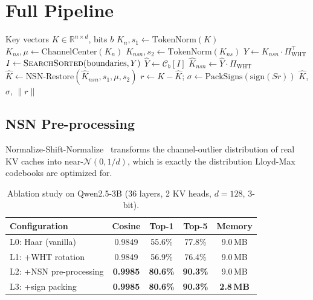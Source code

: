 \documentclass[letterpaper,11pt]{article}
\newcommand{\R}{\mathbb{R}}
\newcommand{\norm}[1]{\lVert #1 \rVert}
\begin{document}
\section{Full Pipeline}
\label{sec:pipeline}

\begin{algorithm}
\caption{TurboQuant Extended Pipeline}
\label{alg:pipeline}
\begin{algorithmic}[1]
\REQUIRE Key vectors $K \in \R^{n \times d}$, bits $b$
\STATE $K_n, s_1 \gets \text{TokenNorm}(K)$ 
\STATE $K_{ns}, \mu \gets \text{ChannelCenter}(K_n)$ 
\STATE $K_{nsn}, s_2 \gets \text{TokenNorm}(K_{ns})$ 
\STATE $Y \gets K_{nsn} \cdot \Pi_{\mathrm{WHT}}^\top$ 
\STATE $I \gets \textsc{SearchSorted}(\text{boundaries}, Y)$ 
\STATE $\hat{Y} \gets \mathcal{C}_b[I]$ 
\STATE $\hat{K}_{nsn} \gets \hat{Y} \cdot \Pi_{\mathrm{WHT}}$
\STATE $\hat{K} \gets \text{NSN-Restore}(\hat{K}_{nsn}, s_1, \mu, s_2)$
\STATE $r \gets K - \hat{K}$; $\sigma \gets \text{PackSigns}(\text{sign}(Sr))$
\RETURN $\hat{K}$, $\sigma$, $\norm{r}$
\end{algorithmic}
\end{algorithm}

\subsection{NSN Pre-processing}

Normalize-Shift-Normalize~\cite{nsnquant2025} transforms the
channel-outlier distribution of real KV caches into near-$\mathcal{N}(0, 1/d)$,
which is exactly the distribution Lloyd-Max codebooks are optimized for.

\begin{table}[ht]
\centering
\caption{Ablation study on Qwen2.5-3B (36 layers, 2 KV heads, $d=128$, 3-bit).}
\label{tab:ablation}
\begin{tabular}{lcccc}
\toprule
Configuration & Cosine & Top-1 & Top-5 & Memory \\
\midrule
L0: Haar (vanilla)      & 0.9849 & 55.6\% & 77.8\% & 9.0\,MB \\
L1: +WHT rotation       & 0.9849 & 56.9\% & 76.4\% & 9.0\,MB \\
L2: +NSN pre-processing & \textbf{0.9985} & \textbf{80.6\%} & \textbf{90.3\%} & 9.0\,MB \\
L3: +sign packing       & \textbf{0.9985} & \textbf{80.6\%} & \textbf{90.3\%} & \textbf{2.8\,MB} \\
\bottomrule
\end{tabular}
\end{table}
\end{document}
